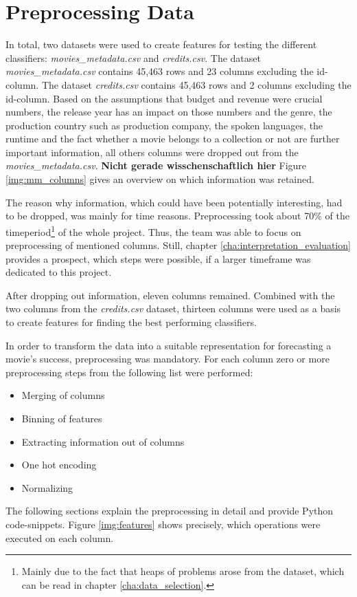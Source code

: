 \chapter{Preprocessing Data}
\label{cha:preprocessing}

In total, two datasets were used to create features for testing the different classifiers:
\textit{movies\_metadata.csv} and \textit{credits.csv}. The dataset \textit{movies\_metadata.csv} contains 45,463 rows and 23 columns excluding the id-column. The dataset \textit{credits.csv} contains 45,463 rows and 2 columns excluding the id-column. Based on the assumptions that budget and revenue were crucial numbers, the release year has an impact on those numbers and the genre, the production country such as production company, the spoken languages, the runtime and the fact whether a movie belongs to a collection or not are further important information, all others columns were dropped out from the \textit{movies\_metadata.csv}. \textbf{Nicht gerade wisschenschaftlich hier} Figure \ref{img:mm_columns} gives an overview on which information was retained.

The reason why information, which could have been potentially interesting, had to be dropped, was mainly for time reasons. Preprocessing took about 70\% of the timeperiod\footnote{Mainly due to the fact that heaps of problems arose from the dataset, which can be read in chapter \ref{cha:data_selection}.} of the whole project. Thus, the team was able to focus on preprocessing of mentioned columns. Still, chapter \ref{cha:interpretation_evaluation} provides a prospect, which steps were possible, if a larger timeframe was dedicated to this project.

After dropping out information, eleven columns remained. Combined with the two columns from the \textit{credits.csv} dataset, thirteen columns were used as a basis to create features for finding the best performing classifiers.

In order to transform the data into a suitable representation for forecasting a movie's success, preprocessing was mandatory. For each column zero or more preprocessing steps from the following list were performed:
\begin{itemize}
	\item Merging of columns
	\item Binning of features
	\item Extracting information out of columns
	\item One hot encoding
	\item Normalizing
\end{itemize}
The following sections explain the preprocessing in detail and provide Python code-snippets. Figure \ref{img:features} shows precisely, which operations were executed on each column.

